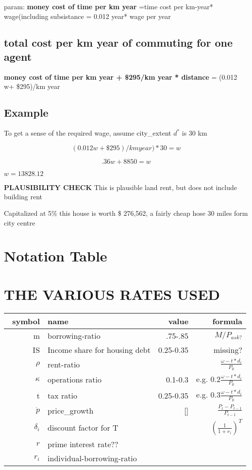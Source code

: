 param: \textbf{money cost of time per km year} =time cost per km-year* wage(including subsistance = 0.012 year* wage per year



\subsection{total cost per km year of commuting for one agent}

\textbf{money cost of time per km year + \$295/km year * distance} = (0.012 w+ \$295)/km year 

\subsection{Example}
To get a sense of the required wage, assume city\_extent $d^*$ is 30 km \

\[(0.012 w+ \$295)/km year)*30 =  w\] 

\[.36w+ 8850=w\]

$w=13828.12$

\textbf{PLAUSIBILITY CHECK}
This is plausible land rent, but does not include building rent

Capitalized at 5\% this house is worth \$ 276,562, a fairly cheap hose 30 miles form city centre


\section{Notation Table}



\section{THE VARIOUS RATES USED}


\renewcommand{\arraystretch}{1.5}
\begin{tabular}{rlrr}\
symbol  & name              & value&formula  \\ \hline
m       & borrowing-ratio   & .75-.85 &$M/P_{ask?}$  \\
IS&Income share for housing debt&0.25-0.35&missing?\\
$\rho   $&rent-ratio        & & $\frac{\omega-t*d_i}{P_0}$\\
$\kappa $&operations ratio  &0.1-0.3& e.g. $ 0.2\frac{\omega-t*d_i}{P_0}$\\
    t       &tax ratio      & 0.25-0.35 &e.g. $ 0.3\frac{\omega-t*d_i}{P_0}$\\
$\dot p $ &price\_growth &[] & $\frac{P_t-P_{t-1}}{P_{t-1}}$\\
$\delta_i$ & discount factor for T& & $\left(\frac{1}{1+r_i}\right)^T$ \\
$r$     &prime interest rate??       &&\\
$r_i$   & individual-borrowing-ratio & &\\
\end{tabular}
\renewcommand{\arraystretch}{1.0}




